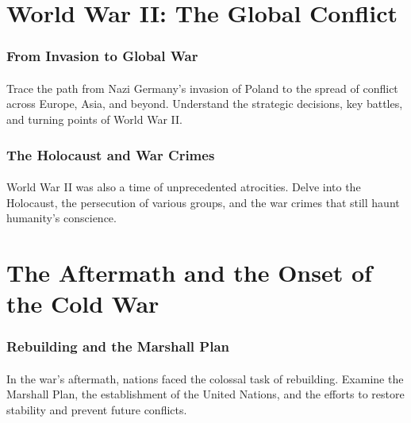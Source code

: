 \documentclass[a4paper,12pt]{book}
\begin{document}
\section*{World War II: The Global Conflict}
\paragraph{}
\subsubsection*{From Invasion to Global War}
\paragraph{}
Trace the path from Nazi Germany’s invasion of Poland to the spread of conflict across Europe, Asia, and beyond. Understand the strategic decisions, key battles, and turning points of World War II.

\subsubsection*{The Holocaust and War Crimes}
\paragraph{}
World War II was also a time of unprecedented atrocities. Delve into the Holocaust, the persecution of various groups, and the war crimes that still haunt humanity’s conscience.

\section*{The Aftermath and the Onset of the Cold War}
\paragraph{}
\subsubsection*{Rebuilding and the Marshall Plan}
\paragraph{}
In the war’s aftermath, nations faced the colossal task of rebuilding. Examine the Marshall Plan, the establishment of the United Nations, and the efforts to restore stability and prevent future conflicts.
\end{document}
